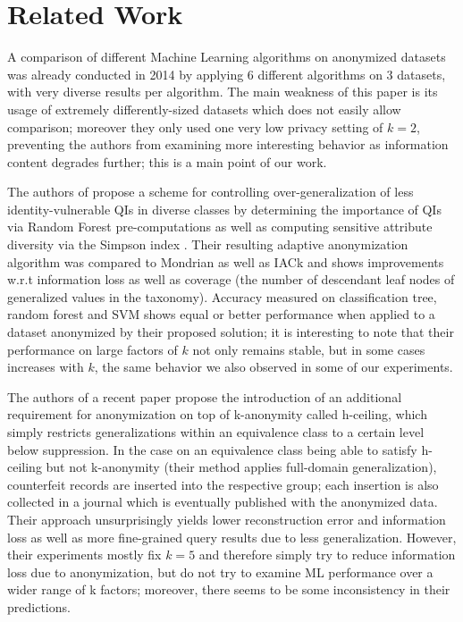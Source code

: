 \documentclass{llncs}
\begin{document}
\section{Related Work}
\label{sect:related_work}

A comparison of different Machine Learning algorithms on anonymized datasets was already conducted in 2014 \cite{Wimmer2014} by applying 6 different algorithms on 3 datasets, with very diverse results per algorithm. The main weakness of this paper is its usage of extremely differently-sized datasets which does not easily allow comparison; moreover they only used one very low privacy setting of $k=2$, preventing the authors from examining more interesting behavior as information content degrades further; this is a main point of our work.

The authors of \cite{Majeed2017} propose a scheme for controlling over-generalization of less identity-vulnerable QIs in diverse classes by determining the importance of QIs via Random Forest pre-computations as well as computing sensitive attribute diversity via the Simpson index \cite{simpson1949measurement}. Their resulting adaptive anonymization algorithm was compared to Mondrian \cite{lefevre2006mondrian} as well as IACk \cite{li2011information} and shows improvements w.r.t information loss as well as coverage (the number of descendant leaf nodes of generalized values in the taxonomy). Accuracy measured on classification tree, random forest and SVM shows equal or better performance when applied to a dataset anonymized by their proposed solution; it is interesting to note that their performance on large factors of $k$ not only remains stable, but in some cases increases with $k$, the same behavior we also observed in some of our experiments.


The authors of a recent paper \cite{LeeHCeiling2017} propose the introduction of an additional requirement for anonymization on top of k-anonymity called h-ceiling, which simply restricts generalizations within an equivalence class to a certain level below suppression. In the case on an equivalence class being able to satisfy h-ceiling but not k-anonymity (their method applies full-domain generalization), counterfeit records are inserted into the respective group; each insertion is also collected in a journal which is eventually published with the anonymized data. Their approach unsurprisingly yields lower reconstruction error and information loss as well as more fine-grained query results due to less generalization. However, their experiments mostly fix $k=5$ and therefore simply try to reduce information loss due to anonymization, but do not try to examine ML performance over a wider range of k factors; moreover, there seems to be some inconsistency in their predictions.
\end{document}
